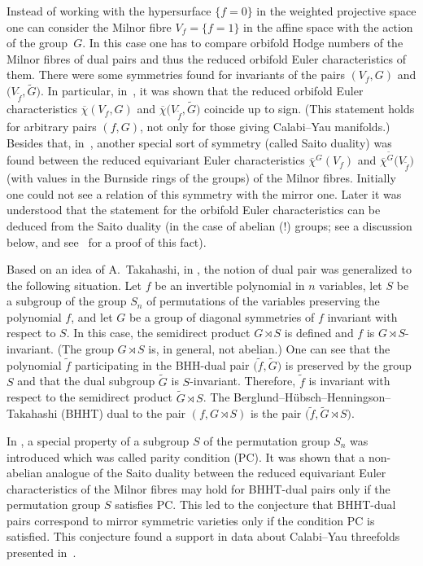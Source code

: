 \documentclass[pdftex]{sigma}
\numberwithin{equation}{section}
\begin{document}
Instead of working with the hypersurface $\{ f=0 \}$ in the weighted projective space one can consider
the Milnor fibre $V_f=\{ f=1 \}$ in the affine space with the action of the group~$G$.
In this case one has to compare orbifold Hodge numbers of the Milnor fibres of dual pairs
and thus the reduced orbifold Euler characteristics of them. There were some
symmetries found for invariants of the pairs $(V_f, G)$ and $\big(V_{\widetilde{f}}, \widetilde{G}\big)$.
In particular, in~\cite{EG-MMJ}, it was shown that the reduced orbifold Euler characteristics
$\overline{\chi}(V_f,G)$ and $\overline{\chi}\big(V_{\widetilde{f}}, \widetilde{G}\big)$ coincide up to sign. (This statement holds for arbitrary pairs $(f,G)$, not only for those giving Calabi--Yau manifolds.)
Besides that, in~\cite{EG-BLMS}, another special sort of symmetry (called Saito duality) was found between the reduced equivariant Euler characteristics $\overline{\chi}^G(V_f)$ and
$\overline{\chi}^{\widetilde{G}}\big(V_{\widetilde{f}}\big)$ (with values in the Burnside rings of the groups) of the Milnor fibres. Initially one could not see a relation of this symmetry with the
mirror one. Later it was understood that the statement for the orbifold Euler characteristics can be
deduced from the Saito duality (in the case of abelian (!) groups; see a discussion below, and see~\cite{EG-1811} for a proof of this fact).

Based on an idea of A.~Takahashi, in \cite{EG-IMRN}, the notion of dual pair was generalized to the following situation. Let $f$ be an invertible polynomial in $n$ variables, let $S$ be a subgroup of the group $S_n$ of permutations of the variables preserving the polynomial $f$, and let $G$ be a group of diagonal symmetries of $f$ invariant with respect to $S$. In this case, the semidirect product $G \rtimes S$ is defined and $f$ is $G \rtimes S$-invariant. (The group $G \rtimes S$ is, in general, not abelian.) One can see that the polynomial $\widetilde{f}$ participating in the BHH-dual pair $\big(\widetilde{f}, \widetilde{G}\big)$ is preserved by the group $S$ and that the dual subgroup $\widetilde{G}$ is $S$-invariant. Therefore, $\widetilde{f}$ is invariant with respect to the semidirect product $\widetilde{G} \rtimes S$. The Berglund--H\"ubsch--Henningson--Takahashi (BHHT) dual to the pair $(f, G \rtimes S)$ is the pair $\big(\widetilde{f},\widetilde{G} \rtimes S\big)$.

In \cite{EG-IMRN}, a special property of a subgroup $S$ of the permutation group $S_n$ was introduced which was called parity condition (PC). It was shown that a non-abelian analogue of the Saito duality between the reduced equivariant Euler characteristics of the Milnor fibres may hold for BHHT-dual pairs only if the permutation group $S$ satisfies PC. This led to the conjecture that BHHT-dual pairs correspond to mirror symmetric varieties only if the condition PC is satisfied. This conjecture found a support in data about Calabi--Yau threefolds presented in~\cite{Yu}.
\end{document}
